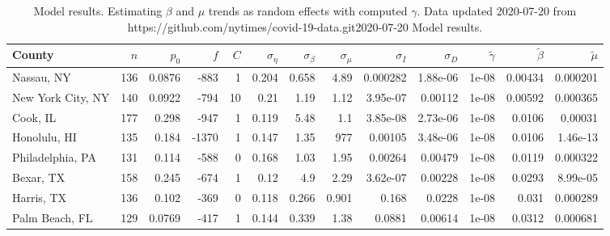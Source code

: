 \documentclass[12pt,letterpaper]{article}
\begin{document}
\begin{sidewaystable}
\caption{\label{tab:sumres}
Model results. Estimating $\beta$ and $\mu$ trends as random effects with computed $\gamma$.
Data updated 2020-07-20 from https://github.com/nytimes/covid-19-data.git2020-07-20
Model results.
}
\centering
{\small


\begin{tabular}{lrrrrrrrrrrrr}
\hline
 County            &   $n$ &   $p_0$ &   $f$ &   $C$ &   $\sigma_\eta$ &   $\sigma_\beta$ &   $\sigma_\mu$ &   $\sigma_I$ &   $\sigma_D$ &   $\tilde\gamma$ &   $\tilde{\beta}$ &   $\tilde{\mu}$ \\
\hline
 Nassau, NY        &   136 &  0.0876 &  -883 &     1 &          0.204  &           0.658  &          4.89  &     0.000282 &     1.88e-06 &            1e-08 &           0.00434 &        0.000201 \\
 New York City, NY &   140 &  0.0922 &  -794 &    10 &          0.21   &           1.19   &          1.12  &     3.95e-07 &     0.00112  &            1e-08 &           0.00592 &        0.000365 \\
 Cook, IL          &   177 &  0.298  &  -947 &     1 &          0.119  &           5.48   &          1.1   &     3.85e-08 &     2.73e-06 &            1e-08 &           0.0106  &        0.00031  \\
 Honolulu, HI      &   135 &  0.184  & -1370 &     1 &          0.147  &           1.35   &        977     &     0.00105  &     3.48e-06 &            1e-08 &           0.0106  &        1.46e-13 \\
 Philadelphia, PA  &   131 &  0.114  &  -588 &     0 &          0.168  &           1.03   &          1.95  &     0.00264  &     0.00479  &            1e-08 &           0.0119  &        0.000322 \\
 Bexar, TX         &   158 &  0.245  &  -674 &     1 &          0.12   &           4.9    &          2.29  &     3.62e-07 &     0.00228  &            1e-08 &           0.0293  &        8.99e-05 \\
 Harris, TX        &   136 &  0.102  &  -369 &     0 &          0.118  &           0.266  &          0.901 &     0.168    &     0.0228   &            1e-08 &           0.031   &        0.000289 \\
 Palm Beach, FL    &   129 &  0.0769 &  -417 &     1 &          0.144  &           0.339  &          1.38  &     0.0881   &     0.00614  &            1e-08 &           0.0312  &        0.000681 \\

\end{tabular}}
\end{sidewaystable}
\end{document}
